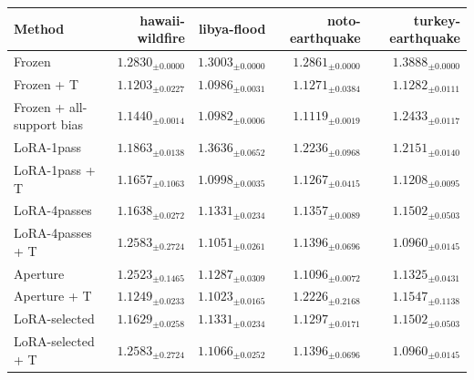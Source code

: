 \begin{tabular}{lrrrr}
\toprule
Method & hawaii-wildfire & libya-flood & noto-earthquake & turkey-earthquake \\
\midrule
Frozen & $1.2830_{\pm 0.0000}$ & $1.3003_{\pm 0.0000}$ & $1.2861_{\pm 0.0000}$ & $1.3888_{\pm 0.0000}$ \\
Frozen + T & $1.1203_{\pm 0.0227}$ & $1.0986_{\pm 0.0031}$ & $1.1271_{\pm 0.0384}$ & $1.1282_{\pm 0.0111}$ \\
Frozen + all-support bias & $1.1440_{\pm 0.0014}$ & $1.0982_{\pm 0.0006}$ & $1.1119_{\pm 0.0019}$ & $1.2433_{\pm 0.0117}$ \\
LoRA-1pass & $1.1863_{\pm 0.0138}$ & $1.3636_{\pm 0.0652}$ & $1.2236_{\pm 0.0968}$ & $1.2151_{\pm 0.0140}$ \\
LoRA-1pass + T & $1.1657_{\pm 0.1063}$ & $1.0998_{\pm 0.0035}$ & $1.1267_{\pm 0.0415}$ & $1.1208_{\pm 0.0095}$ \\
LoRA-4passes & $1.1638_{\pm 0.0272}$ & $1.1331_{\pm 0.0234}$ & $1.1357_{\pm 0.0089}$ & $1.1502_{\pm 0.0503}$ \\
LoRA-4passes + T & $1.2583_{\pm 0.2724}$ & $1.1051_{\pm 0.0261}$ & $1.1396_{\pm 0.0696}$ & $1.0960_{\pm 0.0145}$ \\
Aperture & $1.2523_{\pm 0.1465}$ & $1.1287_{\pm 0.0309}$ & $1.1096_{\pm 0.0072}$ & $1.1325_{\pm 0.0431}$ \\
Aperture + T & $1.1249_{\pm 0.0233}$ & $1.1023_{\pm 0.0165}$ & $1.2226_{\pm 0.2168}$ & $1.1547_{\pm 0.1138}$ \\
LoRA-selected & $1.1629_{\pm 0.0258}$ & $1.1331_{\pm 0.0234}$ & $1.1297_{\pm 0.0171}$ & $1.1502_{\pm 0.0503}$ \\
LoRA-selected + T & $1.2583_{\pm 0.2724}$ & $1.1066_{\pm 0.0252}$ & $1.1396_{\pm 0.0696}$ & $1.0960_{\pm 0.0145}$ \\
\bottomrule
\end{tabular}
